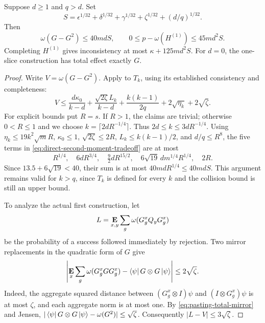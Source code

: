 \documentclass[11pt]{article}
\theoremstyle{definition}
\newcommand{\E}{\mathop{\bf E\/}}
\newcommand{\eps}{\epsilon}
\begin{document}
\begin{corollary}\label{cor:first-construction}
Suppose $d\geq1$ and $q>d$.  Set
\[
 S=\eps^{1/32}+\delta^{1/32}+\gamma^{1/32}
     +\zeta^{1/32}+(d/q)^{1/32}.
\]
Then
\[
 \omega(G-G^2)\leq40mdS,\qquad
 0\leq p-\omega(H^{(1)})\leq45md^2S.
\]
Completing $H^{(1)}$ gives inconsistency at most $\kappa+125md^2S$.
For $d=0$, the one-slice construction has total effect exactly $G$.
\end{corollary}
\begin{proof}
Write $V=\omega(G-G^2)$.  Apply 
to $T_k$, using its established consistency and completeness:
\begin{equation}\label{eq:direct-second-moment-tradeoff}
 V\leq\frac{d\kappa_0}{k-d}
  +\frac{\sqrt{2\zeta}L_k}{k-d}
  +\frac{k(k-1)}{2q}+2\sqrt{\eta_k}+2\sqrt\zeta.
\end{equation}
For explicit bounds put $R=s$.  If $R>1$, the claims are trivial;
otherwise $0<R\leq1$ and we choose $k=\lceil2dR^{-1/4}\rceil$.
Thus $2d\leq k\leq3dR^{-1/4}$.
Using $\eta_k\leq19k^2\sqrt m R$, $\kappa_0\leq1$,
$\sqrt{2\zeta}\leq2R$,
$L_k\leq k(k-1)/2$, and $d/q\leq R^8$,
the five terms in \eqref{eq:direct-second-moment-tradeoff} are at most
\[
 R^{1/4},\quad6dR^{3/4},\quad
 \tfrac92dR^{15/2},\quad6\sqrt{19}\,d m^{1/4}R^{1/4},\quad2R.
\]
Since $13.5+6\sqrt{19}<40$, their sum is at most
$40mdR^{1/4}\leq40mdS$.
This argument remains valid for $k>q$, since $T_k$ is defined for
every $k$ and the collision bound is still an upper bound.

To analyze the actual first construction, let
\[
 L=\E_{x,y}\sum_g\omega(G_g^xQ_yG_g^x)
\]
be the probability of a success followed immediately by rejection.
Two mirror replacements in the quadratic form of $G$ give
\[
 \left|\E_x\sum_g\omega(G_g^xGG_g^x)
       -\bra\psi G\otimes G\ket\psi\right|\leq2\sqrt\zeta.
\]
Indeed, the aggregate squared distance between
$(G_g^x\otimes I)\psi$ and $(I\otimes G_g^x)\psi$ is at most
$\zeta$, and each aggregate norm is at most one.
By \eqref{eq:pasting-total-mirror} and Jensen,
$|\bra\psi G\otimes G\ket\psi-\omega(G^2)|\leq\sqrt\zeta$.
Consequently $|L-V|\leq3\sqrt\zeta$.


\end{proof}
\end{document}
